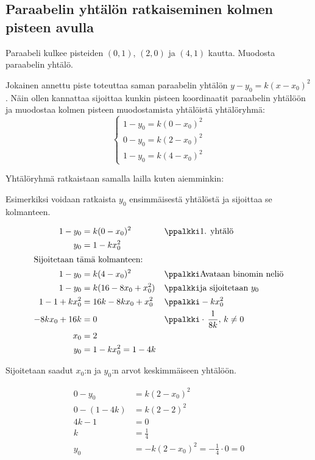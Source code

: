 \subsection{Paraabelin yhtälön ratkaiseminen kolmen pisteen avulla}

\begin{esimerkki}
	Paraabeli kulkee pisteiden $(0,1)$, $(2,0)$ ja $(4,1)$ kautta. Muodosta paraabelin yhtälö.
	
	\begin{esimratk} 
		Jokainen annettu piste toteuttaa saman paraabelin yhtälön $y - y_0 = k(x-x_0)^2$. Näin ollen kannattaa sijoittaa kunkin pisteen koordinaatit paraabelin yhtälöön ja muodostaa kolmen pisteen muodostamista yhtälöistä yhtälöryhmä:
		\[
		\left\{
		\begin{aligned}
		1 - y_0 = k(0 - x_0)^2 \\
		0 - y_0 = k(2 - x_0)^2 \\
		1 - y_0 = k(4 - x_0)^2
		\end{aligned}
		\right.
		\]

		Yhtälöryhmä ratkaistaan samalla lailla kuten aiemminkin:
		
		Esimerkiksi voidaan ratkaista $y_0$ ensimmäisestä yhtälöstä ja sijoittaa se kolmanteen.

\begin{align*}
	1 - y_0 &= k(0 - x_0)^2 &&\ppalkki \text{1. yhtälö}\\
	y_0 &= 1- kx^2_0	 \\
    \intertext{Sijoitetaan tämä kolmanteen:}
	1-y_0 &= k(4-x_0)^2 &&\ppalkki \text{Avataan binomin neliö} \\
	1-y_0 &= k(16 - 8x_0 + x_0^2) &&\ppalkki \text{ja sijoitetaan }y_0 \\
	1-1+kx^2_0 &= 16k - 8kx_0 + x^2_0 &&\ppalkki -kx^2_0 \\
	-8kx_0 + 16k &= 0 &&\ppalkki \cdot \, \frac{1}{8k}, \, k \neq 0 \\
	x_0 &= 2 \\
	y_0 &= 1- kx^2_0 = 1 - 4k	
\end{align*}	

		 Sijoitetaan saadut $x_0$:n ja $y_0$:n arvot keskimmäiseen yhtälöön.

\begin{align*}	
	0 - y_0 &= k(2 - x_0)^2 \\
	0 - (1 - 4k) &= k(2-2)^2 \\
	4k -1 &= 0 \\
	k &= \frac{1}{4} \\
	y_0 &= -k(2 - x_0)^2 = - \frac{1}{4} \cdot 0 = 0
\end{align*}


\end{esimratk}
\end{esimerkki}
